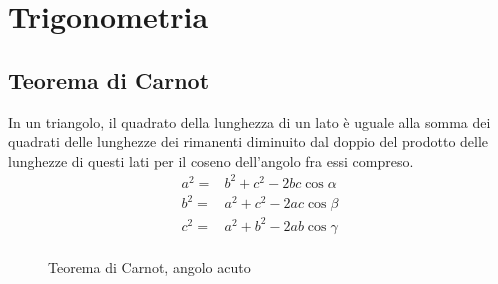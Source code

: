 \chapter{Trigonometria}
\section{Teorema di Carnot}
\begin{thm}\label{thm:TeoremadiCarnot}
	In un triangolo, il quadrato della lunghezza di un lato è uguale alla somma dei quadrati delle lunghezze dei rimanenti diminuito dal doppio del prodotto delle lunghezze di questi lati per il coseno dell'angolo fra essi compreso. 
	\begin{align*}
	a^2=&b^2+c^2-2bc\cos\alpha\\
	b^2=&a^2+c^2-2ac\cos\beta\\
	c^2=&a^2+b^2-2ab\cos\gamma\\
	\end{align*}
\end{thm}
\begin{figure}
	\centering
	
	\caption{Teorema di Carnot, angolo acuto}
	\label{fig:triangolopitagorico1}
\end{figure}
